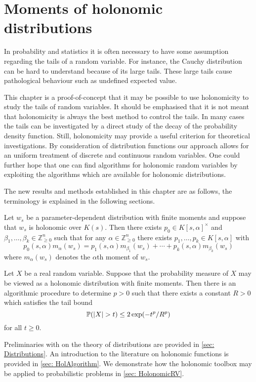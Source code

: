 \chapter{Moments of holonomic distributions}
In probability and statistics it is often necessary to have some assumption regarding the tails of a random variable.
For instance, the Cauchy distribution can be hard to understand because of its large tails.
These large tails cause pathological behaviour such as undefined expected value.

This chapter is a proof-of-concept that it may be possible to use holonomicity to study the tails of random variables.
It should be emphasised that it is not meant that holonomicity is always the best method to control the tails.
In many cases the tails can be investigated by a direct study of the decay of the probability density function.
Still, holonomicity may provide a useful criterion for theoretical investigations.
By consideration of distribution functions our approach allows for an uniform treatment of discrete and continuous random variables.
One could further hope that one can find algorithms for holonomic random variables by exploiting the algorithms which are available for holonomic distributions.

The new results and methods established in this chapter are as follows, the terminology is explained in the following sections. 
\begin{result}
  Let $w_s$ be a parameter-dependent distribution with finite moments and suppose that $w_s$ is holonomic over $K(s)$.
  Then there exists $p_0\in K[s,\alpha]^\times$ and $\beta_1,\ldots,\beta_k\in \mathbb{Z}_{\geq 0}^n$ such that for any $\alpha \in \mathbb{Z}_{\geq 0}^n$ there exists $p_1,\ldots,p_k \in K[s,\alpha]$ with
  $$p_0(s,\alpha) m_{\alpha}(w_s) = p_1(s,\alpha) m_{\beta_1}(w_s)+ \cdots + p_k(s,\alpha) m_{\beta_k}(w_s)$$
  where $m_\alpha(w_s)$ denotes the $\alpha$th moment of $w_s$.
\end{result}
\begin{result}
    Let $X$ be a real random variable. Suppose that the probability measure of $X$ may be viewed as a holonomic distribution with finite moments. Then there is an algorithmic procedure to determine $p>0$ such that there exists a constant $R>0$ which satisfies the tail bound 
    $$\mathbb{P}(\vert X \vert>t) \leq 2\exp(-t^p/R^p)$$
    for all $t\geq 0$. 
\end{result}
Preliminaries with on the theory of distributions are provided in \cref{sec: Distributions}.
An introduction to the literature on holonomic functions is provided in \cref{sec: HolAlgorithm}.
We demonstrate how the holonomic toolbox may be applied to probabilistic problems in \cref{sec: HolonomicRV}.
